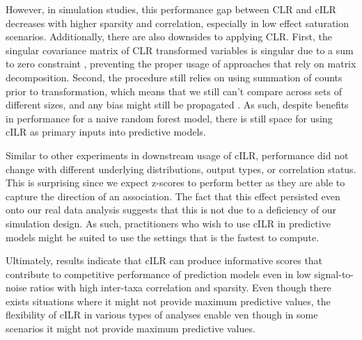 \documentclass[10pt,letterpaper]{article}
\begin{document}
However, in simulation studies, this performance gap between CLR and cILR decreases with higher sparsity and correlation, especially in low effect saturation scenarios. Additionally, there are also downsides to applying CLR. First, the singular covariance matrix of CLR transformed variables is singular due to a sum to zero constraint \cite{gloor2017}, preventing the proper usage of approaches that rely on matrix decomposition. Second, the procedure still relies on using summation of counts prior to transformation, which means that we still can't compare across sets of different sizes, and any bias might still be propagated \cite{mclaren2019}. As such, despite benefits in performance for a naive random forest model, there is still space for using cILR as primary inputs into predictive models. 

Similar to other experiments in downstream usage of cILR, performance did not change with different underlying distributions, output types, or correlation status. This is surprising since we expect z-scores to perform better as they are able to capture the direction of an association. The fact that this effect persisted even onto our real data analysis suggests that this is not due to a deficiency of our simulation design. As such, practitioners who wish to use cILR in predictive models might be suited to use the settings that is the fastest to compute.  

Ultimately, results indicate that cILR can produce informative scores that contribute to competitive performance of prediction models even in low signal-to-noise ratios with high inter-taxa correlation and sparsity. Even though there exists situations where it might not provide maximum predictive values, the flexibility of cILR in various types of analyses enable ven though in some scenarios it might not provide maximum predictive values. 
\end{document}
